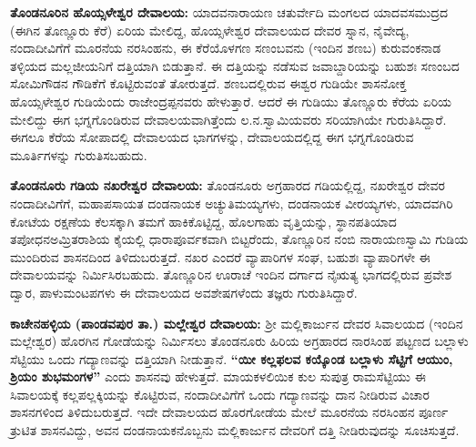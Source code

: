 \textbf{ತೊಂಡನೂರಿನ ಹೊಯ್ಸಳೇಶ್ವರ ದೇವಾಲಯ:} ಯಾದವನಾರಾಯಣ ಚತುರ್ವೇದಿ ಮಂಗಲದ ಯಾದವಸಮುದ್ರದ (ಈಗಿನ ತೊಣ್ಣೂರು ಕೆರೆ) ಏರಿಯ ಮೇಲಿದ್ದ, ಹೊಯ್ಸಳೇಶ್ವರ ದೇವಾಲಯದ ದೇವರ ಸ್ನಾನ, ನೈವೇದ್ಯ, ನಂದಾದೀವಿಗೆಗೆ ಮೂರನೆಯ ನರಸಿಂಹನು, ಈ ಕೆರೆಯೊಳಗಣ ಸಣಂಬವನು (ಇಂದಿನ ಶಣಬ) ಕುರುವಂಕನಾಡ ತಳ್ಳಿಯದ ಮಲ್ಲಜೀಯನಿಗೆ ದತ್ತಿಯಾಗಿ ಬಿಡುತ್ತಾನೆ. ಈ ದತ್ತಿಯನ್ನು ನಡೆಸುವ ಜವಾಬ್ದಾರಿಯನ್ನು ಬಹುಶಃ ಸಣಂಬದ ಸೋಮಿಗೌಡನ ಗೌಡಿಕೆಗೆ ಕೊಟ್ಟಿರುವಂತೆ ತೋರುತ್ತದೆ. ಶಣಬದಲ್ಲಿರುವ ಈಶ್ವರ ಗುಡಿಯೇ ಶಾಸನೋಕ್ತ ಹೊಯ್ಸಳೇಶ್ವರ ಗುಡಿಯೆಂದು ರಾಜೇಂದ್ರಪ್ಪ\-ನವರು ಹೇಳುತ್ತಾರೆ. ಆದರೆ ಈ ಗುಡಿಯು ತೊಣ್ಣೂರು ಕೆರೆಯ ಏರಿಯ ಮೇಲಿದ್ದು ಈಗ ಭಗ್ನಗೊಂಡಿರುವ ದೇವಾಲಯವಾಗಿತ್ತೆಂದು ಲ.ನ.ಸ್ವಾಮಿಯವರು ಸರಿಯಾಗಿಯೇ ಗುರುತಿಸಿದ್ದಾರೆ. ಈಗಲೂ ಕೆರೆಯ ಸೋಪಾದಲ್ಲಿ ದೇವಾಲಯದ ಭಾಗಗಳನ್ನು, ದೇವಾಲಯದಲ್ಲಿದ್ದ ಈಗ ಭಗ್ನಗೊಂಡಿರುವ ಮೂರ್ತಿಗಳನ್ನು ಗುರುತಿಸಬಹುದು.

\newpage

\textbf{ತೊಂಡನೂರು ಗಡಿಯ ನಖರೇಶ್ವರ ದೇವಾಲಯ:} ತೊಂಡನೂರು ಅಗ್ರಹಾರದ ಗಡಿಯಲ್ಲಿದ್ದ, ನಖರೇಶ್ವರ ದೇವರ ನಂದಾದೀವಿಗೆಗೆ, ಮಹಾಪಸಾಯತ ದಂಡನಾಯಕ ಅಚ್ಯುತಿಮಯ್ಯಗಳು, ದಂಡನಾಯಕ ವೀರಯ್ಯಗಳು, ಯಾದವಗಿರಿ ಕೋಟೆಯ ರಕ್ಷಣೆಯ ಕೆಲಸಕ್ಕಾಗಿ ತಮಗೆ ಹಾಕಿಕೊಟ್ಟಿದ್ದ, ಹೊಲಗಾಹು ವೃತ್ತಿಯನ್ನು, ಸ್ಥಾನಪತಿಯಾದ ತಪೋಧನ\break ಅಮ್ರಿತರಾಶಿಯ ಕೈಯಲ್ಲಿ ಧಾರಾಪೂರ್ವಕವಾಗಿ ಬಿಟ್ಟರೆಂದು, ತೊಣ್ಣೂರಿನ ನಂಬಿ ನಾರಾಯಣಸ್ವಾಮಿ ಗುಡಿಯ ಮುಂದಿರುವ ಶಾಸನದಿಂದ ತಿಳಿದುಬರುತ್ತದೆ. ನಖರ ಎಂದರೆ ವ್ಯಾಪಾರಿಗಳ ಸಂಘ, ಬಹುಶಃ ವ್ಯಾಪಾರಿಗಳೇ ಈ ದೇವಾಲಯವನ್ನು ನಿರ್ಮಿಸಿರಬಹುದು. ತೊಣ್ಣೂರಿನ ಊರಾಚೆ ಇಂದಿನ ದರ್ಗಾದ ನೈಋತ್ಯ ಭಾಗದಲ್ಲಿರುವ ಪ್ರವೇಶ ದ್ವಾರ, ಪಾಳುಮಂಟಪಗಳು ಈ ದೇವಾಲಯದ ಅವಶೇಷಗಳೆಂದು ತಜ್ಞರು ಗುರುತಿಸಿದ್ದಾರೆ.

\textbf{ಕಾಚೇನಹಳ್ಳಿಯ (ಪಾಂಡವಪುರ ತಾ.) ಮಲ್ಲೇಶ್ವರ ದೇವಾಲಯ:} ಶ‍್ರೀ ಮಲ್ಲಿಕಾರ್ಜುನ ದೇವರ ಸಿವಾಲಯದ (ಇಂದಿನ ಮಲ್ಲೇಶ್ವರ) ಹೊರಗಿನ ಗೋಡೆಯನ್ನು ನಿರ್ಮಿಸಲು ತೊಂಡನೂರು ಹಿರಿಯ ಅಗ್ರಹಾರದ ನಾರಸಿಂಹ ಪಟ್ಟಣದ ಬಲ್ಲಾಳು ಸೆಟ್ಟಿಯು ಒಂದು ಗದ್ಯಾಣವನ್ನು ದತ್ತಿಯಾಗಿ ನೀಡುತ್ತಾನೆ. \textbf{“ಯೀ ಕಲ್ಲಫಲವ ಕಯ್ಕೊಂಡ ಬಲ್ಲಾಳು ಸೆಟ್ಟಿಗೆ ಆಯುಂ, ಶ್ರಿಯಂ ಶುಭಮಂಗಳ”} ಎಂದು ಶಾಸನವು ಹೇಳುತ್ತದೆ. ಮಾಯಕಳಲಿಯಿಕ ಕುಲ ಸುಪುತ್ರ ರಾಮಸೆಟ್ಟಿಯು ಈ ಸಿವಾಲಯಕ್ಕೆ ಕಲ್ಲಪಲ್ಲಕ್ಕಿಯನ್ನು ಕೊಟ್ಟಿರುವ, ನಂದಾದೀವಿಗೆಗೆ ಒಂದು ಗದ್ಯಾಣವನ್ನು ದಾನ ನೀಡಿರುವ ವಿಚಾರ ಶಾಸನಗಳಿಂದ ತಿಳಿದುಬರುತ್ತದೆ. ಇದೇ ದೇವಾಲಯದ ಹೊರಗೋಡೆಯ ಮೇಲೆ ಮೂರನೆಯ ನರಸಿಂಹನ ಪೂರ್ಣ ತ್ರುಟಿತ ಶಾಸನವಿದ್ದು, ಅವನ ದಂಡನಾಯಕನೊಬ್ಬನು ಮಲ್ಲಿಕಾರ್ಜುನ ದೇವರಿಗೆ ದತ್ತಿ ನೀಡಿರುವುದನ್ನು ಸೂಚಿಸುತ್ತದೆ.


